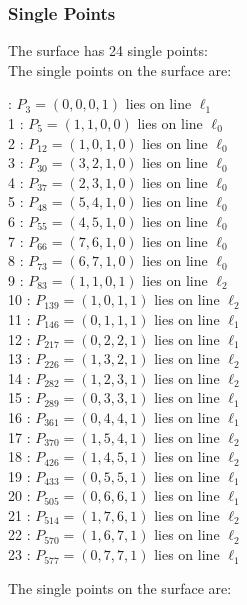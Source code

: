 \documentclass{article}
\begin{document}
{\subsubsection*{Single Points}
The surface has 24 single points:\\
The single points on the surface are:\\
\begin{multicols}{2}
 : $P_{3}=( 0, 0, 0, 1 )$ lies on line $\ell_{1}$\\
1 : $P_{5}=( 1, 1, 0, 0 )$ lies on line $\ell_{0}$\\
2 : $P_{12}=( 1, 0, 1, 0 )$ lies on line $\ell_{0}$\\
3 : $P_{30}=( 3, 2, 1, 0 )$ lies on line $\ell_{0}$\\
4 : $P_{37}=( 2, 3, 1, 0 )$ lies on line $\ell_{0}$\\
5 : $P_{48}=( 5, 4, 1, 0 )$ lies on line $\ell_{0}$\\
6 : $P_{55}=( 4, 5, 1, 0 )$ lies on line $\ell_{0}$\\
7 : $P_{66}=( 7, 6, 1, 0 )$ lies on line $\ell_{0}$\\
8 : $P_{73}=( 6, 7, 1, 0 )$ lies on line $\ell_{0}$\\
9 : $P_{83}=( 1, 1, 0, 1 )$ lies on line $\ell_{2}$\\
10 : $P_{139}=( 1, 0, 1, 1 )$ lies on line $\ell_{2}$\\
11 : $P_{146}=( 0, 1, 1, 1 )$ lies on line $\ell_{1}$\\
12 : $P_{217}=( 0, 2, 2, 1 )$ lies on line $\ell_{1}$\\
13 : $P_{226}=( 1, 3, 2, 1 )$ lies on line $\ell_{2}$\\
14 : $P_{282}=( 1, 2, 3, 1 )$ lies on line $\ell_{2}$\\
15 : $P_{289}=( 0, 3, 3, 1 )$ lies on line $\ell_{1}$\\
16 : $P_{361}=( 0, 4, 4, 1 )$ lies on line $\ell_{1}$\\
17 : $P_{370}=( 1, 5, 4, 1 )$ lies on line $\ell_{2}$\\
18 : $P_{426}=( 1, 4, 5, 1 )$ lies on line $\ell_{2}$\\
19 : $P_{433}=( 0, 5, 5, 1 )$ lies on line $\ell_{1}$\\
20 : $P_{505}=( 0, 6, 6, 1 )$ lies on line $\ell_{1}$\\
21 : $P_{514}=( 1, 7, 6, 1 )$ lies on line $\ell_{2}$\\
22 : $P_{570}=( 1, 6, 7, 1 )$ lies on line $\ell_{2}$\\
23 : $P_{577}=( 0, 7, 7, 1 )$ lies on line $\ell_{1}$\\
\end{multicols}
The single points on the surface are:\\
}
\end{document}
